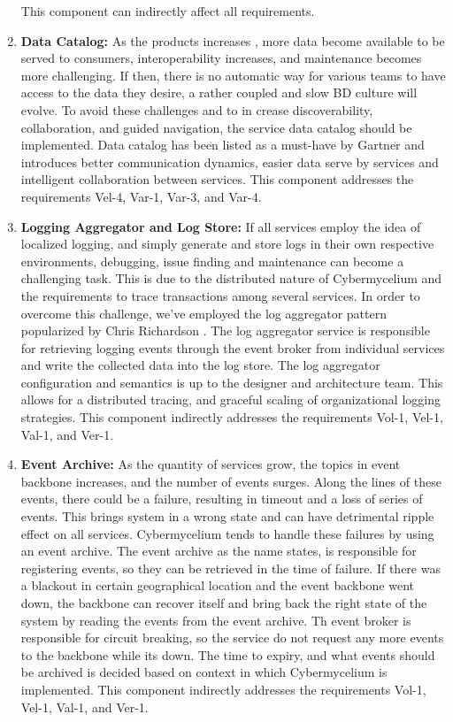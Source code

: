 \documentclass[review]{elsarticle}
\begin{document}
\begin{enumerate}
    This component can indirectly affect all requirements.

    \item \textbf{Data Catalog:} As the products increases , more data become available to be served to consumers, interoperability increases, and maintenance becomes more challenging. If then, there is no automatic way for various teams to have access to the data they desire, a rather coupled and slow BD culture will evolve. To avoid these challenges and to in crease discoverability, collaboration, and guided navigation, the service data catalog should be implemented. Data catalog has been listed as a must-have by Gartner \cite{GartnerDataCatalog} and introduces better communication dynamics, easier data serve by services and intelligent collaboration between services. This component addresses the requirements Vel-4, Var-1, Var-3, and Var-4.
    
    \item \textbf{Logging Aggregator and Log Store:} If all services employ the idea of localized logging, and simply generate and store logs in their own respective environments, debugging, issue finding and maintenance can become a challenging task. This is due to the distributed nature of Cybermycelium and the requirements to trace transactions among several services. In order to overcome this challenge, we've employed the log aggregator pattern popularized by Chris Richardson \cite{MicroServicesPatterns}. The log aggregator service is responsible for retrieving logging events through the event broker from individual services and write the collected data into the log store. The log aggregator configuration and semantics is up to the designer and architecture team. This allows for a distributed tracing, and graceful scaling of organizational logging strategies. This component indirectly addresses the requirements Vol-1, Vel-1, Val-1, and Ver-1.

    \item \textbf{Event Archive:} As the quantity of services grow, the topics in event backbone increases, and the number of events surges. Along the lines of these events, there could be a failure, resulting in timeout and a loss of series of events. This brings system in a wrong state and can have detrimental ripple effect on all services. Cybermycelium tends to handle these failures by using an event archive. The event archive as the name states, is responsible for registering events, so they can be retrieved in the time of failure. If there was a blackout in certain geographical location and the event backbone went down, the backbone can recover itself and bring back the right state of the system by reading the events from the event archive. Th event broker is responsible for circuit breaking, so the service do not request any more events to the backbone while its down. The time to expiry, and what events should be archived is decided based on context in which Cybermycelium is implemented. This component indirectly addresses
    the requirements Vol-1, Vel-1, Val-1, and Ver-1.


\end{enumerate}
\end{document}
